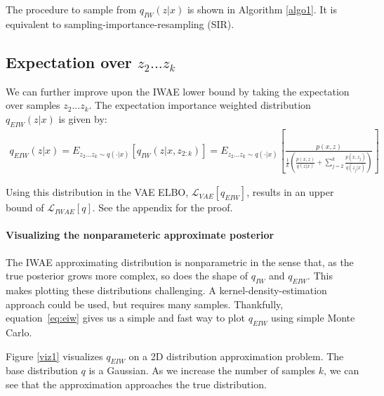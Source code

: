 \documentclass{article} %
\begin{document}
The procedure to sample from $q_{IW}(z|x)$ is shown in Algorithm \ref{algo1}.
It is equivalent to sampling-importance-resampling (SIR). 





\subsection{Expectation over \texorpdfstring{$z_2...z_k$}{} }

We can further improve upon the IWAE lower bound by taking the expectation over samples $z_2 ... z_k$. The expectation importance weighted distribution $q_{EIW}(z|x)$ is given by:
\begin{align} 
    q_{EIW}(z|x)
    = E_{z_{2}...z_{k} \sim q(\cdot |x)} \left[ q_{IW}(z|x,z_{2:k}) \right] 
    = E_{z_{2}...z_{k} \sim q(\cdot |x)} \left[ \frac{p(x,z)}{  \frac{1}{k} \left( \frac{p(x,z)}{q(z|x)}+ \sum_{j=2}^k \frac{p(x,z_j)}{q(z_j|x)} \right) } \right] \label{marg} 
\end{align}

Using this distribution in the VAE ELBO, $\mathcal{L}_{VAE}[q_{EIW}]$, results in an upper bound of $\mathcal{L}_{IWAE}[q]$. See the appendix for the proof.

\paragraph{Visualizing the nonparameteric approximate posterior}
The IWAE approximating distribution is nonparametric in the sense that, as the true posterior grows more complex, so does the shape of $q_{IW}$ and $q_{EIW}$.
This makes plotting these distributions challenging.
A kernel-density-estimation approach could be used, but requires many samples.
Thankfully, equation~\eqref{eq:eiw} gives us a simple and fast way to plot $q_{EIW}$ using simple Monte Carlo.

Figure \ref{viz1} visualizes $q_{EIW}$ on a 2D distribution approximation problem.
The base distribution $q$ is a Gaussian.
As we increase the number of samples $k$, we can see that the approximation approaches the true distribution.
\end{document}
